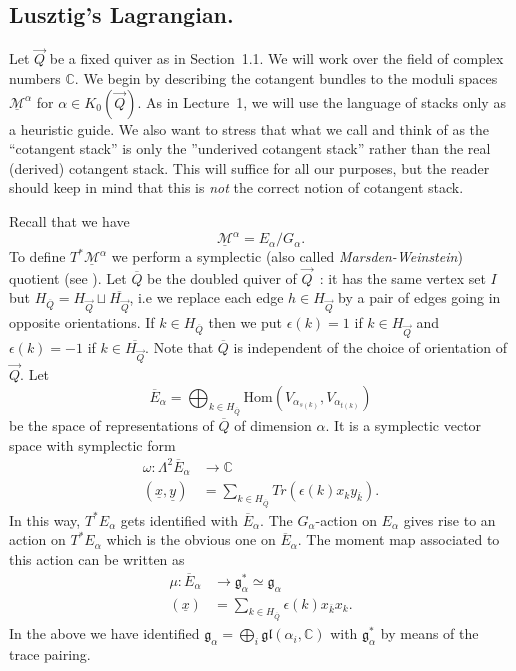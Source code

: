 \documentclass[a4paper,10pt]{amsart}
\def\vecdq{\overline{Q}}
\def\a{\alpha}
\def\C{\mathbb{C}}
\def\g{\mathfrak{g}}
\numberwithin{equation}{section}
\begin{document}
\vspace{.3in}

\subsection{Lusztig's Lagrangian.}

\vspace{.15in}

Let $\vec{Q}$ be a fixed quiver as in Section~1.1. We will work over the field of complex numbers $\C$. We begin by describing the cotangent bundles to the moduli spaces $\underline{\mathcal{M}}^{\a}$ for $\a \in K_0(\vec{Q})$. As in Lecture~1, we will use the language of stacks only as a heuristic guide. We also want to stress that what we call and think of as the ``cotangent stack'' is only the ''underived cotangent stack'' rather than the real (derived) cotangent stack. This will suffice for all our purposes, but the reader should keep in mind that this is \textit{not} the correct notion of cotangent stack.

\vspace{.1in}

Recall that we have
$$\underline{\mathcal{M}}^{\a}=E_{\a} /G_{\a}.$$
To define $T^* \underline{\mathcal{M}}^{\a}$ we perform a symplectic (also called \textit{Marsden-Weinstein}) quotient (see \cite{Marsden}). Let $\vecdq$ be the doubled quiver of $\vec{Q}$~: it has the same vertex set $I$ but $H_{\vecdq}=H_{\vec{Q}} \sqcup \overline{H_{\vec{Q}}}$, i.e we replace each edge $h \in H_{\vec{Q}}$ by a pair of edges going in opposite orientations. If $k \in H_{\vecdq}$ then we put $\epsilon(k)=1$ if $k \in H_{\vec{Q}}$ and $\epsilon(k)=-1$ if $k \in \overline{H_{\vec{Q}}}$. Note that $\vecdq$ is independent of the choice of orientation of $\vec{Q}$. Let 
$$\overline{E}_{\a}=\bigoplus_{k \in H_{\vecdq}} \text{Hom}(V_{\a_{s(k)}}, V_{\a_{t(k)}})$$
be the space of representations of $\vecdq$ of dimension $\a$. It is a symplectic vector space with symplectic form
\begin{equation}
\begin{split}
\omega: \Lambda^2 \overline{E}_{\a} &\to \C\\
(\underline{x}, \underline{y}) &=\sum_{k \in H_{\vecdq}} Tr(\epsilon(k) x_ky_{\overline{k}}).
\end{split}
\end{equation}
In this way, $T^*E_{\a}$ gets identified with $\overline{E}_{\a}$. The $G_{\a}$-action on $E_{\a}$ gives rise to an action on $T^*E_{\a}$ which is the obvious one on $\overline{E}_{\a}$. The moment map associated to this action can be written as
\begin{equation}
\begin{split}
\mu:  \overline{E}_{\a} &\to \g_{\a}^* \simeq \g_{\a}\\
(\underline{x}) &=\sum_{k \in H_{\vecdq}} \epsilon(k) x_{\overline{k}}x_{k}.
\end{split}
\end{equation}
In the above we have identified $\g_{\a}=\bigoplus_{i} \mathfrak{gl}(\a_i,\C)$ with $\g^*_{\a}$ by means of the trace pairing. 
\end{document}
